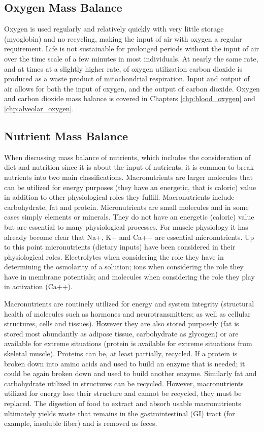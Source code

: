 \subsection{Oxygen Mass Balance}
Oxygen is used regularly and relatively quickly with very little storage (myoglobin) and no recycling, making the input of air with oxygen a regular requirement. Life is not sustainable for prolonged periods without the input of air over the time scale of a few minutes in most individuals. At nearly the same rate, and at times at a slightly higher rate, of oxygen utilization carbon dioxide is produced as a waste product of mitochondrial respiration. Input and output of air allows for both the input of oxygen, and the output of carbon dioxide. Oxygen and carbon dioxide mass balance is covered in Chapters \ref{chp:blood_oxygen} and \ref{chp:alveolar_oxygen}.


\subsection{Nutrient Mass Balance}

When discussing mass balance of nutrients, which includes the consideration of diet and nutrition since it is about the input of nutrients, it is common to break nutrients into two main classifications. Macronutrients are larger molecules that can be utilized for energy purposes (they have an energetic, that is caloric) value in addition to other physiological roles they fulfill. Macronutrients include carbohydrate, fat and protein. Micronutrients are small molecules and in some cases simply elements or minerals. They do not have an energetic (caloric) value but are essential to many physiological processes. For muscle physiology it has already become clear that Na+, K+ and Ca++ are essential micronutrients. Up to this point micronutrients (dietary inputs) have been considered in their physiological roles. Electrolytes when considering the role they have in determining the osmolarity of a solution; ions when considering the role they have in membrane potentials; and molecules when considering the role they play in activation (Ca++).

Macronutrients are routinely utilized for energy and system integrity (structural health of molecules such as hormones and neurotransmitters; as well as cellular structures, cells and tissues). However they are also stored purposely (fat is stored most abundantly as adipose tissue, carbohydrate as glycogen) or are available for extreme situations (protein is available for extreme situations from skeletal muscle). Proteins can be, at least partially, recycled. If a protein is broken down into amino acids and used to build an enzyme that is needed; it could be again broken down and used to build another enzyme. Similarly fat and carbohydrate utilized in structures can be recycled. However, macronutrients utilized for energy lose their structure and cannot be recycled, they must be replaced. The digestion of food to extract and absorb usable macronutrients\footnotemark{} ultimately yields waste that remains in the gastrointestinal (GI) tract (for example, insoluble fiber) and is removed as feces. 


